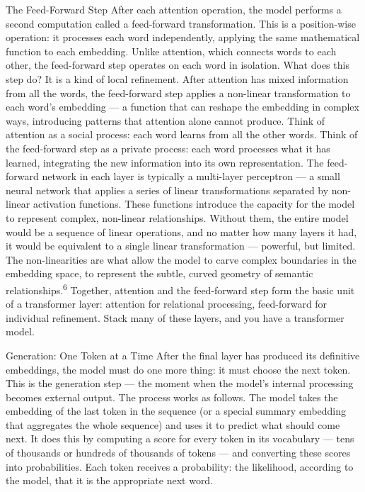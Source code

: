 The Feed-Forward Step After each attention operation, the model performs a second computation called a feed-forward transformation. This is a position-wise operation: it processes each word independently, applying the same mathematical function to each embedding. Unlike attention, which connects words to each other, the feed-forward step operates on each word in isolation. What does this step do? It is a kind of local refinement. After attention has mixed information from all the words, the feed-forward step applies a non-linear transformation to each word’s embedding — a function that can reshape the embedding in complex ways, introducing patterns that attention alone cannot produce. Think of attention as a social process: each word learns from all the other words. Think of the feed-forward step as a private process: each word processes what it has learned, integrating the new information into its own representation. The feed-forward network in each layer is typically a multi-layer perceptron — a small neural network that applies a series of linear transformations separated by non-linear activation functions. These functions introduce the capacity for the model to represent complex, non-linear relationships. Without them, the entire model would be a sequence of linear operations, and no matter how many layers it had, it would be equivalent to a single linear transformation — powerful, but limited. The non-linearities are what allow the model to carve complex boundaries in the embedding space, to represent the subtle, curved geometry of semantic relationships.\textsuperscript{6} Together, attention and the feed-forward step form the basic unit of a transformer layer: attention for relational processing, feed-forward for individual refinement. Stack many of these layers, and you have a transformer model.

Generation: One Token at a Time After the final layer has produced its definitive embeddings, the model must do one more thing: it must choose the next token. This is the generation step — the moment when the model’s internal processing becomes external output. The process works as follows. The model takes the embedding of the last token in the sequence (or a special summary embedding that aggregates the whole sequence) and uses it to predict what should come next. It does this by computing a score for every token in its vocabulary — tens of thousands or hundreds of thousands of tokens — and converting these scores into probabilities. Each token receives a probability: the likelihood, according to the model, that it is the appropriate next word.

